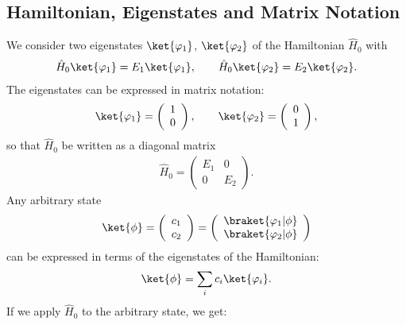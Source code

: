 	\subsection{Hamiltonian, Eigenstates and Matrix Notation}

			We consider two eigenstates $\ket{\varphi_1}$, $\ket{\varphi_2}$ of the Hamiltonian $\hat{H}_0$ with
			\begin{align}
				\hat{H}_0\ket{\varphi_1}=E_1\ket{\varphi_1}, \qquad \hat{H}_0\ket{\varphi_2}=E_2\ket{\varphi_2}.
			\end{align}
			The eigenstates can be expressed in matrix notation:
			\begin{align}
				\ket{\varphi_1}=\left( \begin{array}{c} 1 \\ 0 \end{array} \right), \qquad \ket{\varphi_2}=\left( \begin{array}{c} 0 \\ 1 \end{array} \right),
			\end{align}
			so that $\hat{H}_0$ be written as a diagonal matrix
			\begin{align}
				\hat{H}_0 = \left(\begin{array}{cc} E_1 & 0 \\ 0 & E_2 \end{array}\right).
			\end{align}
			Any arbitrary state 
			\begin{align}
				\ket{\phi} = \left( \begin{array}{c} c_1 \\ c_2 \end{array} \right) = \left( \begin{array}{c} \braket{\varphi_1|\phi} \\ \braket{\varphi_2|\phi} \end{array} \right)
			\end{align}
			can be expressed in terms of the eigenstates of the Hamiltonian:
			\begin{align}
				\ket{\phi} = \sum_i c_i \ket{\varphi_i}.
			\end{align}
			If we apply $\hat{H}_0$ to the arbitrary state, we get:

